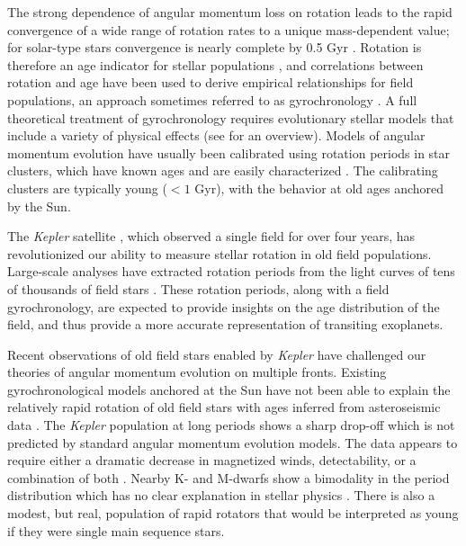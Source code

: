 \documentclass[twocolumn]{aastex6}
\newcommand{\Kepler}{\mbox{\textit{Kepler}}}
\begin{document}
The strong dependence of angular momentum loss on rotation \citep{Kawaler88}
leads to the rapid convergence of a wide range of rotation rates to a unique
mass-dependent value; for solar-type stars convergence is nearly complete by
0.5 Gyr \citep{Pinsonneault89}. Rotation is therefore an age indicator for 
stellar populations \citep{Skumanich72}, and correlations between rotation and
age have been used to derive empirical relationships for field populations, 
an approach sometimes referred to as gyrochronology \citep{Barnes07, Mamajek08, Meibom09,
Angus15}. A full theoretical treatment of gyrochronology requires evolutionary 
stellar models that include a variety of physical effects (see \citet{Gallet13} 
for an overview). Models of angular momentum evolution have usually been 
calibrated using rotation periods in star clusters, which have known ages and 
are easily characterized \citep{Krishnamurthi97, Gallet13, Somers17}. The 
calibrating clusters are typically young (\(< 1\) Gyr), with the behavior at old 
ages anchored by the Sun. 

The \Kepler{} satellite \citep{Borucki10,Koch10}, which observed a single field
for over four years, has revolutionized our ability to measure stellar 
rotation in old field populations. Large-scale analyses have extracted 
rotation periods from the light curves of tens of thousands of field stars
\citep{Nielsen13, Reinhold13, Garcia14, McQuillan14}. These rotation periods, 
along with a field gyrochronology, are expected to provide insights on the age 
distribution of the field, and thus provide a more accurate representation of 
transiting exoplanets.

Recent observations of old field stars enabled by \Kepler{} have challenged 
our theories of angular momentum evolution on multiple fronts. Existing 
gyrochronological models anchored at the Sun have not been able to explain
the relatively rapid rotation of old field stars with ages inferred from
asteroseismic data \citep{Angus15, VanSaders16}. The \Kepler{} population at 
long periods shows a sharp drop-off which is not predicted by standard angular
momentum evolution models. The data appears to require either a dramatic
decrease in magnetized winds, detectability, or a combination of both 
\citep{VanSaders18}.  Nearby K- and M-dwarfs show a bimodality in 
the period distribution which has no clear explanation in stellar physics 
\citep{Davenport18}. There is also a modest, but real, population of rapid 
rotators that would be interpreted as young if they were single main sequence 
stars.
\end{document}
